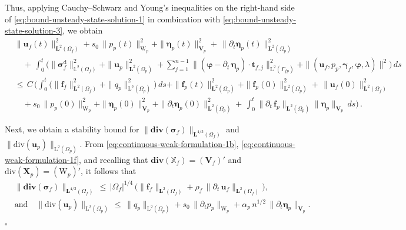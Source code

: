 \documentclass[11pt]{article}
\numberwithin{equation}{section}
\newcommand{\bgamma}{{\boldsymbol\gamma}}
\newcommand{\bbeta}{{\boldsymbol\eta}}
\newcommand{\bsi}{{\boldsymbol\sigma}}
\newcommand{\bvarphi}{{\boldsymbol\varphi}}
\newcommand{\f}{\mathbf{f}}
\newcommand{\bu}{\mathbf{u}}
\newcommand{\bt}{{\mathbf{t}}}
\newcommand{\0}{{\mathbf{0}}}
\def\bX{\mathbf{X}}
\def\bV{\mathbf{V}}
\newcommand{\bL}{\mathbf{L}}
\newcommand\bbX{\mathbb{X}}
\newcommand\bbL{\mathbb{L}}
\def\L{\mathrm{L}}
\def\W{\mathrm{W}}
\def\rd{\mathrm{d}}
\def\bdiv{\mathbf{div}}
\def\div{\mathrm{div}}
\newenvironment{proof}{\noindent{\it Proof.}}{\hfill$\square$}
\numberwithin{equation}{section}
\begin{document}
\begin{proof}
Thus, applying Cauchy--Schwarz and Young's inequalities on the right-hand side of \eqref{eq:bound-unsteady-state-solution-1} in combination with \eqref{eq:bound-unsteady-state-solution-3}, we obtain
\begin{align}
&\|\bu_f(t)\|^2_{\bL^2(\Omega_f)} + s_0\,\|p_p(t)\|^2_{\W_p} + \|\bbeta_p(t)\|^2_{\bV_p}+ \,\| \partial_t\bbeta_p(t)\|^2_{\bL^2(\Omega_p)} \nonumber \\
&\quad +\, \int^t_0 \Bigg(  \| \bsi^\rd_f\|^2_{\bbL^2(\Omega_f)} + \|\bu_p\|^2_{\bL^2(\Omega_p)} + \sum^{n-1}_{j=1} \|( \bvarphi - \partial_t\,\bbeta_p )\cdot\bt_{f,j}\|^2_{\L^2(\Gamma_{fp})} + \|(\bu_f, p_p, \bgamma_f, \bvarphi, \lambda)\|^2 \Bigg)\, ds \nonumber \\
&\leq\, C\,\Bigg( \int^t_0 \Big( \|\f_f\|^2_{\bL^2(\Omega_f)} + \|q_p\|^2_{\L^2(\Omega_p)} \Big)\,ds 
+ \|\f_p(t)\|^2_{\bL^2(\Omega_p)} + \|\f_p(0)\|^2_{\bL^2(\Omega_p)} +\, \|\bu_f(0)\|^2_{\bL^2(\Omega_f)} 
\nonumber \\
&\quad 
+ s_0\,\|p_p(0)\|^2_{\W_p} + \|\bbeta_p(0)\|^2_{\bV_p} 
+ \| \partial_t\bbeta_p(0)\|^2_{\bL^2(\Omega_p)}  +\, \int^t_0 \|\partial_t\,\f_p\|_{\bL^2(\Omega_p)}\|\bbeta_p\|_{\bV_p} \, ds\Bigg)\,.
\label{eq:bound-unsteady-state-solution-6}
\end{align}

Next, we obtain a stability bound for $\|\bdiv(\bsi_f)\|_{\bL^{4/3}(\Omega_f)}$ and $\|\div(\bu_{p})\|_{\L^2(\Omega_p)}$. From \eqref{eq:continuous-weak-formulation-1b}, \eqref{eq:continuous-weak-formulation-1f}, and recalling that $\bdiv(\bbX_f) = (\bV_f)'$ and $\div(\bX_p) = (\W_p)'$, it follows that
\begin{align}
&\|\bdiv(\bsi_f)\|_{\bL^{4/3}(\Omega_f)} 
\,\leq\, |\Omega_f|^{1/4}\,\big(\|\f_f \|_{\bL^2(\Omega_f)} + \rho_f\,\|\partial_t\,\bu_f \|_{\bL^2(\Omega_f)}\big), \nonumber \\[1ex]
&\mbox{and}\quad \|\div(\bu_{p})\|_{\L^2(\Omega_p)} 
\,\leq\, \|q_p\|_{\L^2(\Omega_p)} + s_0\,\|\partial_t p_{p}\|_{\W_p} + \alpha_p\,n^{1/2}\,\|\partial_t\bbeta_{p}\|_{\bV_p} .\label{eq:bound-unsteady-state-solution-5}
\end{align}


\end{proof}
\end{document}
